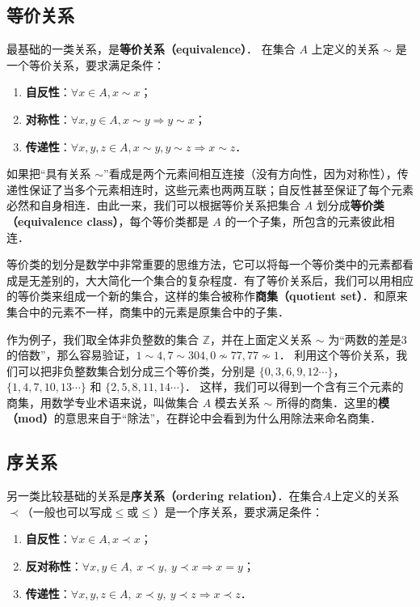 \subsection{等价关系}
最基础的一类关系，是\textbf{等价关系（equivalence）}． 在集合 $A$ 上定义的关系 $\sim$ 是一个等价关系，要求满足条件：
\begin{enumerate}
\item \textbf{自反性}：$\forall x\in A, x\sim x$；
\item \textbf{对称性}：$\forall x, y\in A, x\sim y \Rightarrow y\sim x$；
\item \textbf{传递性}：$\forall x, y, z\in A, x\sim y, y\sim z\Rightarrow x\sim z$．
\end{enumerate}
如果把“具有关系 $\sim$”看成是两个元素间相互连接（没有方向性，因为对称性），传递性保证了当多个元素相连时，这些元素也两两互联；自反性甚至保证了每个元素必然和自身相连．由此一来，我们可以根据等价关系把集合 $A$ 划分成\textbf{等价类（equivalence class）}，每个等价类都是 $A$ 的一个子集，所包含的元素彼此相连．

等价类的划分是数学中非常重要的思维方法，它可以将每一个等价类中的元素都看成是无差别的，大大简化一个集合的复杂程度．有了等价关系后，我们可以用相应的等价类来组成一个新的集合，这样的集合被称作\textbf{商集（quotient set）}．和原来集合中的元素不一样，商集中的元素是原集合中的子集．

作为例子，我们取全体非负整数的集合 $\mathbb{Z}$，并在上面定义关系 $\sim$ 为“两数的差是3的倍数”，那么容易验证，$1\sim4, 7\sim304, 0\not\sim 77, 77\not\sim 1$． 利用这个等价关系，我们可以把非负整数集合划分成三个等价类，分别是 $\{0, 3, 6, 9, 12\cdots \}$，$\{1, 4, 7, 10, 13\cdots\}$ 和 $\{2, 5, 8, 11, 14\cdots\}$． 这样，我们可以得到一个含有三个元素的商集，用数学专业术语来说，叫做集合 $A$ 模去关系 $\sim$ 所得的商集．这里的\textbf{模（mod）}的意思来自于“除法”，在群论中会看到为什么用除法来命名商集．

\subsection{序关系}
另一类比较基础的关系是\textbf{序关系（ordering relation）}．在集合$A$上定义的关系$\prec$（一般也可以写成$\leq$或$\leqslant$）是一个序关系，要求满足条件：
\begin{enumerate}
\item \textbf{自反性}：$\forall x\in A,x\prec x$；
\item \textbf{反对称性}：$\forall x,y\in A,\ x\prec y,\ y\prec x \Rightarrow x = y $；
\item \textbf{传递性}：$\forall x,y,z\in A,\ x\prec y,\ y\prec z \Rightarrow x\prec z $．
\end{enumerate}

